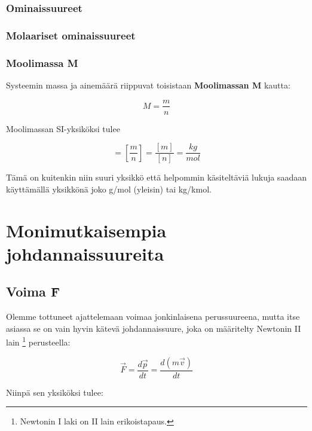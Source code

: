 \documentclass[12pt,a4paper,finnish]{book}
\begin{document}
\subsection{Ominaissuureet}

\subsection{Molaariset ominaissuureet}

\subsection{Moolimassa M}

Systeemin massa ja ainemäärä riippuvat toisistaan \textbf{Moolimassan M} kautta:

\begin{equation}
 M = \frac{m}{n}
\end{equation}

Moolimassan SI-yksiköksi tulee

\begin{equation}
 [M] = \left[\frac{m}{n}\right] = \frac{[m]}{[n]} = \frac{kg}{mol}
\end{equation}

Tämä on kuitenkin niin suuri yksikkö että helpommin käsiteltäviä lukuja saadaan käyttämällä yksikkönä joko 
g/mol (yleisin) tai kg/kmol.

\chapter{Monimutkaisempia johdannaissuureita} %

\section{Voima \={F}} %

Olemme tottuneet ajattelemaan voimaa jonkinlaisena perussuureena, mutta itse asiassa se on vain hyvin kätevä 
johdannaissuure, joka on määritelty Newtonin II lain \footnote{Newtonin I laki on II lain erikoistapaus.} perusteella:

\begin{equation}
 \vec{F} = \frac{d\vec{p}}{dt} = \frac{d(m\vec{v})}{dt}
\end{equation}

Niinpä sen yksiköksi tulee:
\end{document}
